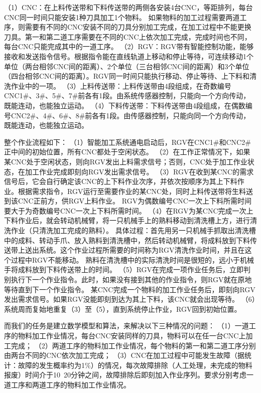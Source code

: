 \documentclass{cumcmthesis}
\begin{document}
（1）CNC：在上料传送带和下料传送带的两侧各安装4台CNC，等距排列，每台CNC同一时间只能安装1种刀具加工1个物料。
如果物料的加工过程需要两道工序，则需要有不同的CNC安装不同的刀具分别加工完成，在加工过程中不能更换刀具。第一和第二道工序需要在不同的CNC上依次加工完成，完成时间也不同，每台CNC只能完成其中的一道工序。
（2）RGV：RGV带有智能控制功能，能够接收和发送指令信号。根据指令能在直线轨道上移动和停止等待，可连续移动1个单位（两台相邻CNC间的距离）、2个单位（三台相邻CNC间的距离）和3个单位（四台相邻CNC间的距离）。RGV同一时间只能执行移动、停止等待、上下料和清洗作业中的一项。
（3）上料传送带：上料传送带由4段组成，在奇数编号CNC1\#、3\#、5\#、7\#前各有1段。由系统传感器控制，只能向一个方向传动，既能连动，也能独立运动。
（4）下料传送带：下料传送带由4段组成，在偶数编号CNC2\#、4\#、6\#、8\#前各有1段。由传感器控制，只能向同一个方向传动，既能连动，也能独立运动。

整个作业流程如下：
（1）智能加工系统通电启动后，RGV在CNC1\#和CNC2\#正中间的初始位置，所有CNC都处于空闲状态。
（2）在工作正常情况下，如果某CNC处于空闲状态，则向RGV发出上料需求信号；否则，CNC处于加工作业状态，在加工作业完成即刻向RGV发出需求信号。
（3）RGV在收到某CNC的需求信号后，它会自行确定该CNC的上下料作业次序，并依次按顺序为其上下料作业。根据需求指令，RGV运行至需要作业的某CNC处，同时上料传送带将生料送到该CNC正前方，供RGV上料作业。
RGV为偶数编号CNC一次上下料所需时间要大于为奇数编号CNC一次上下料所需时间。
（4）在RGV为某CNC完成一次上下料作业后，就会转动机械臂，将一只机械手上的熟料移动到清洗槽上方，进行清洗作业（只清洗加工完成的熟料）。
具体过程：首先用另一只机械手抓取出清洗槽中的成料、转动手爪、放入熟料到清洗槽中，然后转动机械臂，将成料放到下料传送带上送出系统。这个作业过程所需要的时间称为RGV清洗作业时间，并且在这个过程中RGV不能移动。
熟料在清洗槽中的实际清洗时间是很短的，远小于机械手将成料放到下料传送带上的时间。
（5）RGV在完成一项作业任务后，立即判别执行下一个作业指令。此时，如果没有接到其他的作业指令，则RGV就在原地等待直到下一个作业指令。
某CNC完成一个物料的加工作业任务后，即刻向RGV发出需求信号。如果RGV没能即刻到达为其上下料，该CNC就会出现等待。
（6）系统周而复始地重复（3）至（5），直到系统停止作业，RGV回到初始位置。

而我们的任务是建立数学模型和算法，来解决以下三种情况的问题：
（1）一道工序的物料加工作业情况，每台CNC安装同样的刀具，物料可以在任一台CNC上加工完成；
（2）两道工序的物料加工作业情况，每个物料的第一和第二道工序分别由两台不同的CNC依次加工完成；
（3）CNC在加工过程中可能发生故障（据统计：故障的发生概率约为1\%）的情况，每次故障排除（人工处理，未完成的物料报废）时间介于10~20分钟之间，故障排除后即刻加入作业序列。要求分别考虑一道工序和两道工序的物料加工作业情况。
\end{document}
